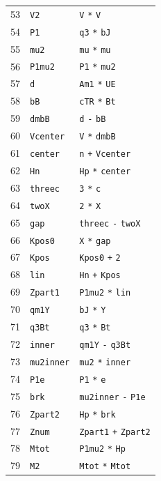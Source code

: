 \begin{longtable}{@{}rll@{}}
53 & \texttt{V2} & \texttt{V} \texttt{*} \texttt{V}\\
54 & \texttt{P1} & \texttt{q3} \texttt{*} \texttt{bJ}\\
55 & \texttt{mu2} & \texttt{mu} \texttt{*} \texttt{mu}\\
56 & \texttt{P1mu2} & \texttt{P1} \texttt{*} \texttt{mu2}\\
57 & \texttt{d} & \texttt{Am1} \texttt{*} \texttt{UE}\\
58 & \texttt{bB} & \texttt{cTR} \texttt{*} \texttt{Bt}\\
59 & \texttt{dmbB} & \texttt{d} \texttt{-} \texttt{bB}\\
60 & \texttt{Vcenter} & \texttt{V} \texttt{*} \texttt{dmbB}\\
61 & \texttt{center} & \texttt{n} \texttt{+} \texttt{Vcenter}\\
62 & \texttt{Hn} & \texttt{Hp} \texttt{*} \texttt{center}\\
63 & \texttt{threec} & \texttt{3} \texttt{*} \texttt{c}\\
64 & \texttt{twoX} & \texttt{2} \texttt{*} \texttt{X}\\
65 & \texttt{gap} & \texttt{threec} \texttt{-} \texttt{twoX}\\
66 & \texttt{Kpos0} & \texttt{X} \texttt{*} \texttt{gap}\\
67 & \texttt{Kpos} & \texttt{Kpos0} \texttt{+} \texttt{2}\\
68 & \texttt{lin} & \texttt{Hn} \texttt{+} \texttt{Kpos}\\
69 & \texttt{Zpart1} & \texttt{P1mu2} \texttt{*} \texttt{lin}\\
70 & \texttt{qm1Y} & \texttt{bJ} \texttt{*} \texttt{Y}\\
71 & \texttt{q3Bt} & \texttt{q3} \texttt{*} \texttt{Bt}\\
72 & \texttt{inner} & \texttt{qm1Y} \texttt{-} \texttt{q3Bt}\\
73 & \texttt{mu2inner} & \texttt{mu2} \texttt{*} \texttt{inner}\\
74 & \texttt{P1e} & \texttt{P1} \texttt{*} \texttt{e}\\
75 & \texttt{brk} & \texttt{mu2inner} \texttt{-} \texttt{P1e}\\
76 & \texttt{Zpart2} & \texttt{Hp} \texttt{*} \texttt{brk}\\
77 & \texttt{Znum} & \texttt{Zpart1} \texttt{+} \texttt{Zpart2}\\
78 & \texttt{Mtot} & \texttt{P1mu2} \texttt{*} \texttt{Hp}\\
79 & \texttt{M2} & \texttt{Mtot} \texttt{*} \texttt{Mtot}\\

\end{longtable}
